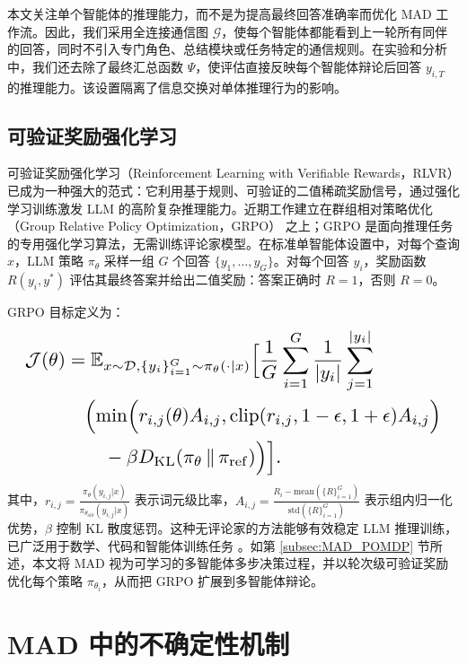 \documentclass{article}
\theoremstyle{plain}
\theoremstyle{definition}
\theoremstyle{remark}
\begin{document}
本文关注单个智能体的推理能力，而不是为提高最终回答准确率而优化 MAD 工作流。因此，我们采用全连接通信图 $\mathcal{G}$，使每个智能体都能看到上一轮所有同伴的回答，同时不引入专门角色、总结模块或任务特定的通信规则。在实验和分析中，我们还去除了最终汇总函数 $\Psi$，使评估直接反映每个智能体辩论后回答 $y_{i,T}$ 的推理能力。该设置隔离了信息交换对单体推理行为的影响。


\subsection{可验证奖励强化学习}
可验证奖励强化学习（Reinforcement Learning with Verifiable Rewards，RLVR）已成为一种强大的范式：它利用基于规则、可验证的二值稀疏奖励信号，通过强化学习训练激发 LLM 的高阶复杂推理能力。近期工作建立在群组相对策略优化（Group Relative Policy Optimization，GRPO）\cite{shao2024deepseekmath} 之上；GRPO 是面向推理任务的专用强化学习算法，无需训练评论家模型。在标准单智能体设置中，对每个查询 $x$，LLM 策略 $\pi_\theta$ 采样一组 $G$ 个回答 $\{y_1, \dots, y_G\}$。对每个回答 $y_i$，奖励函数 $R(y_i, y^*)$ 评估其最终答案并给出二值奖励：答案正确时 $R=1$，否则 $R=0$。

GRPO 目标定义为：
\begin{equation}
\resizebox{0.96\columnwidth}{!}{$
\begin{aligned}
\mathcal{J}(\theta)
&= \mathbb{E}_{x \sim \mathcal{D}, \{y_i\}_{i=1}^G \sim \pi_\theta(\cdot \mid x)}
\Bigl[
\frac{1}{G}\sum_{i=1}^G \frac{1}{\lvert y_i\rvert}\sum_{j=1}^{\lvert y_i\rvert} \\
&\quad \Bigl(\min\Bigl(
r_{i,j}(\theta)A_{i,j},
\operatorname{clip}(r_{i,j},1-\epsilon,1+\epsilon)A_{i,j}
\Bigr) \\
&\qquad -\beta D_{\mathrm{KL}}(\pi_\theta \,\|\, \pi_{\mathrm{ref}})
\Bigr)
\Bigr].
\end{aligned}
$}
\end{equation}
其中，$r_{i,j} = \frac{\pi_\theta(y_{i,j}|x)}{\pi_{\theta_{old}}(y_{i,j}|x)}$ 表示词元级比率，$A_{i,j} = \frac{R_{i} - \text{mean}(\{R\}_{i=1}^G)}{\text{std}(\{R\}_{i=1}^G)}$ 表示组内归一化优势，$\beta$ 控制 KL 散度惩罚。这种无评论家的方法能够有效稳定 LLM 推理训练，已广泛用于数学、代码和智能体训练任务 \cite{yu2025dapo,wei2025swe,jin2025search}。如第 \ref{subsec:MAD_POMDP} 节所述，本文将 MAD 视为可学习的多智能体多步决策过程，并以轮次级可验证奖励优化每个策略 $\pi_{\theta_i}$，从而把 GRPO 扩展到多智能体辩论。


\section{MAD 中的不确定性机制}
\label{sec:theory}
\end{document}
